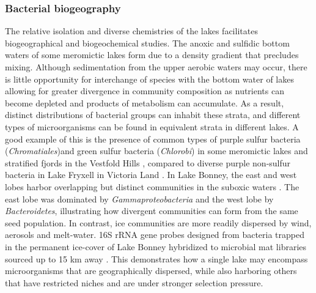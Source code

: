 \subsubsection{Bacterial biogeography}
The relative isolation and diverse chemistries of the lakes facilitates biogeographical and biogeochemical studies. 
The anoxic and sulfidic bottom waters of some meromictic lakes form due to a density gradient that precludes mixing. 
Although sedimentation from the upper aerobic waters may occur, 
there is little opportunity for interchange of species with the bottom water of lakes allowing for greater divergence in community composition as nutrients can become depleted 
and products of metabolism can accumulate.
As a result, distinct distributions of bacterial groups can inhabit these strata, and different types of microorganisms can be found in equivalent strata in different lakes. 
A good example of this is the presence of common types of purple sulfur bacteria (\emph{Chromatiales})and green sulfur bacteria (\emph{Chlorobi}) 
in some meromictic lakes and stratified fjords in the Vestfold Hills \cite{Burke1988},
compared to diverse purple non-sulfur bacteria in Lake Fryxell in Victoria Land \cite{Karr2003}. 
In Lake Bonney, the east and west lobes harbor overlapping but distinct communities in the suboxic waters \cite{Glatz2006}.
The east lobe was dominated by \emph{Gammaproteobacteria} and the west lobe by \emph{Bacteroidetes}, illustrating how divergent communities can form from the same seed population. 
In contrast, ice communities are more readily dispersed by wind, aerosols and melt-water. 
16S rRNA gene probes designed from bacteria trapped in the permanent ice-cover of Lake Bonney hybridized to microbial mat libraries sourced up to 15 km away \cite{Gordon2000}.
This demonstrates how a single lake may encompass microorganisms that are geographically dispersed, while also harboring others that have restricted niches and are under stronger selection pressure.


